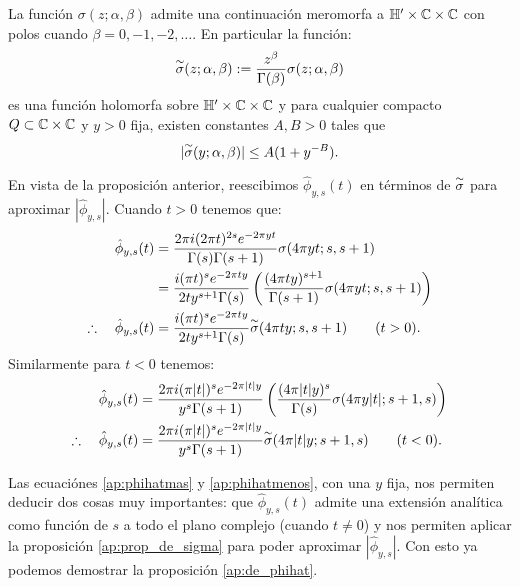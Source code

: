 \begin{prop}\label{ap:prop_de_sigma}%
  La funci\'on $\sigma(z;\alpha,\beta)$ admite una continuaci\'on meromorfa a $\mathbb{H}'\times\mathbb{C}\times\mathbb{C}$
  con polos cuando $\beta=0,-1,-2,\ldots$. En particular la funci\'on:
  \[
    \overset{\sim}{\sigma}(z;\alpha,\beta):=\frac{z^{\beta}}{\Gamma(\beta)}\sigma(z;\alpha,\beta)
  \]
  es una funci\'on holomorfa sobre $\mathbb{H}'\times\mathbb{C}\times\mathbb{C}$ y para cualquier compacto
  $Q\subset\mathbb{C}\times\mathbb{C}$ y $y>0$ fija, existen constantes $A,B>0$ tales que
  \[
    |\overset{\sim}{\sigma}(y;\alpha,\beta)|\leq A(1+y^{-B}).
  \]
\end{prop}%

En vista de la proposici\'on anterior, reescibimos $\hat{\phi}_{y,s}(t)$ en t\'erminos de $\overset{\sim}{\sigma}$ para
aproximar $|\hat{\phi}_{y,s}|$. Cuando $t>0$ tenemos que:
\begin{align}
  \hat{\phi}_{y,s}(t)
  &=\frac{2\pi i(2\pi t)^{2s}e^{-2\pi yt}}{\Gamma(s)\Gamma(s+1)}\sigma(4\pi yt;s,s+1)\nonumber\\
  &=\frac{i(\pi t)^se^{-2\pi ty}}{2ty^{s+1}\Gamma(s)}
    \left( \frac{(4\pi ty)^{s+1}}{\Gamma(s+1)}\sigma(4\pi yt;s,s+1) \right)\nonumber\\
  \therefore\quad \hat{\phi}_{y,s}(t)
  &=\frac{i(\pi t)^se^{-2\pi ty}}{2ty^{s+1}\Gamma(s)}\overset{\sim}{\sigma}(4\pi ty;s,s+1)\qquad(t>0).\label{ap:phihatmas}
\end{align}
Similarmente para $t<0$ tenemos:
\begin{align}
  \hat{\phi}_{y,s}(t)
  &=\frac{2\pi i(\pi |t|)^se^{-2\pi |t|y}}{y^s\Gamma(s+1)}
    \left( \frac{(4\pi |t|y)^{s}}{\Gamma(s)}\sigma(4\pi y|t|;s+1,s) \right)\nonumber\\
  \therefore\quad \hat{\phi}_{y,s}(t)
  &=\frac{2\pi i(\pi |t|)^se^{-2\pi |t|y}}{y^s\Gamma(s+1)}\overset{\sim}{\sigma}(4\pi |t|y;s+1,s)
    \qquad(t<0).\label{ap:phihatmenos}
\end{align}

Las ecuaci\'ones \eqref{ap:phihatmas} y \eqref{ap:phihatmenos}, con una $y$ fija, nos permiten deducir
dos cosas muy importantes: que $\hat{\phi}_{y,s}(t)$ admite una extensi\'on anal\'itica como funci\'on
de $s$ a todo el plano complejo (cuando $t\neq0$) y nos permiten aplicar la proposici\'on
\ref{ap:prop_de_sigma} para poder aproximar $|\hat{\phi}_{y,s}|$. Con esto ya podemos demostrar la
proposici\'on \ref{ap:de_phihat}.


